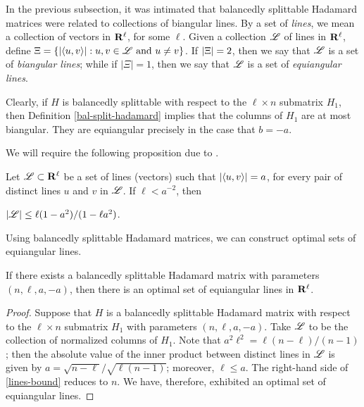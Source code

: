 \documentclass[../../../main]{subfiles}
\begin{document}
In the previous subsection, it was intimated that balancedly splittable Hadamard matrices were related to collections of biangular lines. By a set of {\it lines}, we mean a collection of vectors in $\mathbf{R}^\ell$, for some $\ell$. Given a collection $\mathscr{L}$ of lines in $\mathbf{R}^\ell$, define $\Xi=\{|\langle u,v\rangle| : u,v \in \mathscr{L} \text{ and } u \neq v\}$. If $|\Xi|=2$, then we say that $\mathscr{L}$ is a set of {\it biangular lines}; while if $|\Xi|=1$, then we say that $\mathscr{L}$ is a set of {\it equiangular lines}.

Clearly, if $H$ is balancedly splittable with respect to the $\ell \times n$ submatrix $H_1$, then Definition \ref{bal-split-hadamard} implies that the columns of $H_1$ are at most biangular. They are equiangular precisely in the case that $b=-a$.

We will require the following proposition due to \cite{spherical-codes-designs}.

\begin{prop}
 Let $\mathscr{L} \subset \mathbf{R}^\ell$ be a set of lines (vectors) such that $|\langle u,v\rangle|=a$, for every pair of distinct lines $u$ and $v$ in $\mathscr{L}$. If $\ell < a^{-2}$, then
 \begin{defenum}
  \item\label{lines-bound} $|\mathscr{L}| \leq \ell(1-a^2)/(1-\ell a^2)$.
 \end{defenum}
\end{prop}

Using balancedly splittable Hadamard matrices, we can construct optimal sets of equiangular lines.

\begin{thm}
 If there exists a balancedly splittable Hadamard matrix with parameters $(n,\ell,a,-a)$, then there is an optimal set of equiangular lines in $\mathbf{R}^\ell$.
\end{thm}

\begin{proof}
 Suppose that $H$ is a balancedly splittable Hadamard matrix with respect to the $\ell \times n$ submatrix $H_1$ with parameters $(n,\ell,a,-a)$. Take $\mathscr{L}$ to be the collection of normalized columns of $H_1$. Note that $a^2\ell^2=\ell(n-\ell)/(n-1)$; then the absolute value of the inner product between distinct lines in $\mathscr{L}$ is given by $a=\sqrt{n-\ell}/\sqrt{\ell(n-1)}$; moreover, $\ell \leq a$. The right-hand side of \ref{lines-bound} reduces to $n$. We have, therefore, exhibited an optimal set of equiangular lines.
\end{proof}
\end{document}
